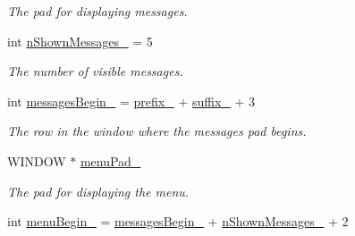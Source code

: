 \begin{DoxyCompactItemize}
\begin{DoxyCompactList}\small\item\em The pad for displaying messages. \end{DoxyCompactList}\item 
int \hyperlink{structslb_1_1core_1_1ui_1_1LogWindow_a1ad6a6bf6c5aac46ede8209b39fd4474}{n\+Shown\+Messages\+\_\+} = 5\hypertarget{structslb_1_1core_1_1ui_1_1LogWindow_a1ad6a6bf6c5aac46ede8209b39fd4474}{}\label{structslb_1_1core_1_1ui_1_1LogWindow_a1ad6a6bf6c5aac46ede8209b39fd4474}

\begin{DoxyCompactList}\small\item\em The number of visible messages. \end{DoxyCompactList}\item 
int \hyperlink{structslb_1_1core_1_1ui_1_1LogWindow_a698d86fc0ccfcc289a60efa8bff74c09}{messages\+Begin\+\_\+} = \hyperlink{structslb_1_1core_1_1ui_1_1LogWindow_a5d5f3397ad832fd6905f94fa03c0475a}{prefix\+\_\+} + \hyperlink{structslb_1_1core_1_1ui_1_1LogWindow_a7d0ddfe4ebce93798e3fd19fc747d473}{suffix\+\_\+} + 3\hypertarget{structslb_1_1core_1_1ui_1_1LogWindow_a698d86fc0ccfcc289a60efa8bff74c09}{}\label{structslb_1_1core_1_1ui_1_1LogWindow_a698d86fc0ccfcc289a60efa8bff74c09}

\begin{DoxyCompactList}\small\item\em The row in the window where the messages pad begins. \end{DoxyCompactList}\item 
W\+I\+N\+D\+OW $\ast$ \hyperlink{structslb_1_1core_1_1ui_1_1LogWindow_aa17dfb11c6942c30a7bc6142f43a2e50}{menu\+Pad\+\_\+}\hypertarget{structslb_1_1core_1_1ui_1_1LogWindow_aa17dfb11c6942c30a7bc6142f43a2e50}{}\label{structslb_1_1core_1_1ui_1_1LogWindow_aa17dfb11c6942c30a7bc6142f43a2e50}

\begin{DoxyCompactList}\small\item\em The pad for displaying the menu. \end{DoxyCompactList}\item 
int \hyperlink{structslb_1_1core_1_1ui_1_1LogWindow_ace6a065854399318280a201fb283ee12}{menu\+Begin\+\_\+} = \hyperlink{structslb_1_1core_1_1ui_1_1LogWindow_a698d86fc0ccfcc289a60efa8bff74c09}{messages\+Begin\+\_\+} + \hyperlink{structslb_1_1core_1_1ui_1_1LogWindow_a1ad6a6bf6c5aac46ede8209b39fd4474}{n\+Shown\+Messages\+\_\+} + 2\hypertarget{structslb_1_1core_1_1ui_1_1LogWindow_ace6a065854399318280a201fb283ee12}{}\label{structslb_1_1core_1_1ui_1_1LogWindow_ace6a065854399318280a201fb283ee12}


\end{DoxyCompactItemize}
